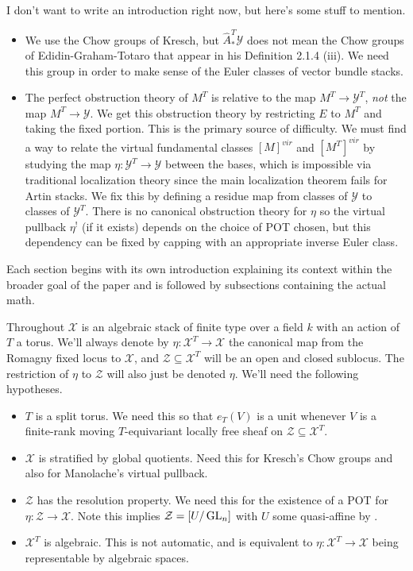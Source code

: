 \documentclass[12pt,dvipsnames]{amsart}
\begin{document}
I don't want to write an introduction right now, but here's some stuff to mention.
\begin{itemize}
  \item We use the Chow groups of Kresch, but \(\hat A_*^T\mathcal Y\) does not mean the Chow groups of Edidin-Graham-Totaro that appear in his Definition 2.1.4 (iii). We need this group in order to make sense of the Euler classes of vector bundle stacks.
  \item The perfect obstruction theory of \(M^T\) is relative to the map \(M^T\to \mathcal Y^T\), \textit{not} the map \(M^T\to \mathcal Y\). We get this obstruction theory by restricting \(E\) to \(M^T\) and taking the fixed portion. This is the primary source of difficulty. We must find a way to relate the virtual fundamental classes \([M]^{vir}\) and \([M^T]^{vir}\) by studying the map \(\eta:\mathcal Y^T\to \mathcal Y\) between the bases, which is impossible via traditional localization theory since the main localization theorem fails for Artin stacks. We fix this by defining a residue map from classes of \(\mathcal Y\) to classes of \(\mathcal Y^T\). There is no canonical obstruction theory for \(\eta\) so the virtual pullback \(\eta^!\) (if it exists) depends on the choice of POT chosen, but this dependency can be fixed by capping with an appropriate inverse Euler class.
\end{itemize}

Each section begins with its own introduction explaining its context within the broader goal of the paper and is followed by subsections containing the actual math.

\bigskip

Throughout \(\mathcal X\) is an algebraic stack of finite type over a field \(k\) with an action of \(T\) a torus. We'll always denote by \(\eta:\mathcal X^T\to \mathcal X\) the canonical map from the Romagny fixed locus to \(\mathcal X\), and \(\mathcal Z\subseteq \mathcal X^T\) will be an open and closed sublocus. The restriction of \(\eta\) to \(\mathcal Z\) will also just be denoted \(\eta\). We'll need the following hypotheses.

\noindent
\begin{itemize}
  \item \(T\) is a split torus. We need this so that \(e_T(V)\) is a unit whenever \(V\) is a finite-rank moving \(T\)-equivariant locally free sheaf on \(\mathcal Z\subseteq \mathcal X^T\).
  \item \(\mathcal X\) is stratified by global quotients. Need this for Kresch's Chow groups and also for Manolache's virtual pullback.
  \item \(\mathcal Z\) has the resolution property. We need this for the existence of a POT for \(\eta:\mathcal Z\to \mathcal X\). Note this implies \(\mathcal Z = [U/\operatorname{GL}_n]\) with \(U\) some quasi-affine by \cite{totaro_ResolutionPropertySchemes2004}.
  \item \(\mathcal X^T\) is algebraic. This is not automatic, and is equivalent to \(\eta:\mathcal X^T\to \mathcal X\) being representable by algebraic spaces.
\end{itemize}
\end{document}
